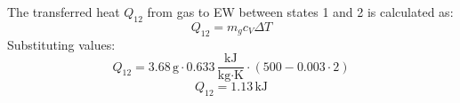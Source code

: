 The transferred heat \( Q_{12} \) from gas to EW between states 1 and 2 is calculated as:  
\[
Q_{12} = m_g c_V \Delta T
\]  
Substituting values:  
\[
Q_{12} = 3.68 \, \text{g} \cdot 0.633 \, \frac{\text{kJ}}{\text{kg·K}} \cdot (500 - 0.003 \cdot 2)
\]  
\[
Q_{12} = 1.13 \, \text{kJ}
\]